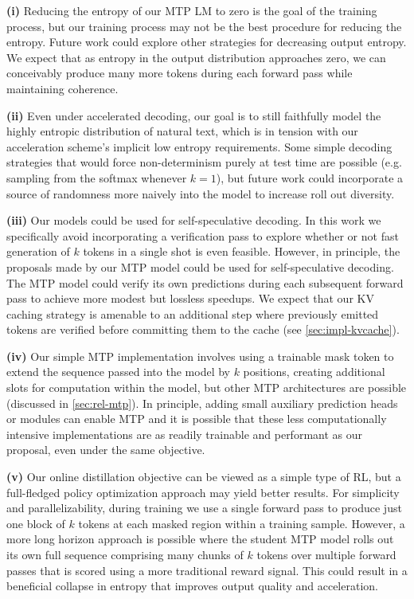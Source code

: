 \documentclass{article}
\theoremstyle{plain}
\theoremstyle{definition}
\theoremstyle{remark}
\begin{document}
\textbf{(i)} Reducing the entropy of our MTP LM to zero is the goal of the training process, but our training process may not be the best procedure for reducing the entropy. Future work could explore other strategies for decreasing output entropy. We expect that as entropy in the output distribution approaches zero, we can conceivably produce many more tokens during each forward pass while maintaining coherence.

\textbf{(ii)} Even under accelerated decoding, our goal is to still faithfully model the highly entropic distribution of natural text, which is in tension with our acceleration scheme's implicit low entropy requirements. Some simple decoding strategies that would force non-determinism purely at test time are possible (e.g. sampling from the softmax whenever $k=1$), but future work could incorporate a source of randomness more naively into the model to increase roll out diversity.

\textbf{(iii)} Our models could be used for self-speculative decoding. In this work we specifically avoid incorporating a verification pass to explore whether or not fast generation of $k$ tokens in a single shot is even feasible. However, in principle, the proposals made by our MTP model could be used for self-speculative decoding. The MTP model could verify its own predictions during each subsequent forward pass to achieve more modest but lossless speedups. We expect that our KV caching strategy is amenable to an additional step where previously emitted tokens are verified before committing them to the cache (see \cref{sec:impl-kvcache}).

\textbf{(iv)} Our simple MTP implementation involves using a trainable mask token to extend the sequence passed into the model by $k$ positions, creating additional slots for computation within the model, but other MTP architectures are possible (discussed in \cref{sec:rel-mtp}). In principle, adding small auxiliary prediction heads or modules can enable MTP and it is possible that these less computationally intensive implementations are as readily trainable and performant as our proposal, even under the same objective.

\textbf{(v)} Our online distillation objective can be viewed as a simple type of RL, but a full-fledged policy optimization approach may yield better results. For simplicity and parallelizability, during training we use a single forward pass to produce just one block of $k$ tokens at each masked region within a training sample. However, a more long horizon approach is possible where the student MTP model rolls out its own full sequence comprising many chunks of $k$ tokens over multiple forward passes that is scored using a more traditional reward signal. This could result in a beneficial collapse in entropy that improves output quality and acceleration.
\end{document}
